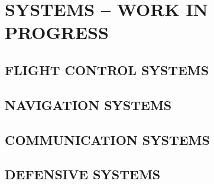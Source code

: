 \chapter{SYSTEMS -- WORK IN PROGRESS}
\minitoc
\cleardoublepage

\section{FLIGHT CONTROL SYSTEMS} 

\clearpage

\section{NAVIGATION SYSTEMS}

\clearpage

\section{COMMUNICATION SYSTEMS}

\clearpage

\section{DEFENSIVE SYSTEMS}

\clearpage

\cleardoublepage